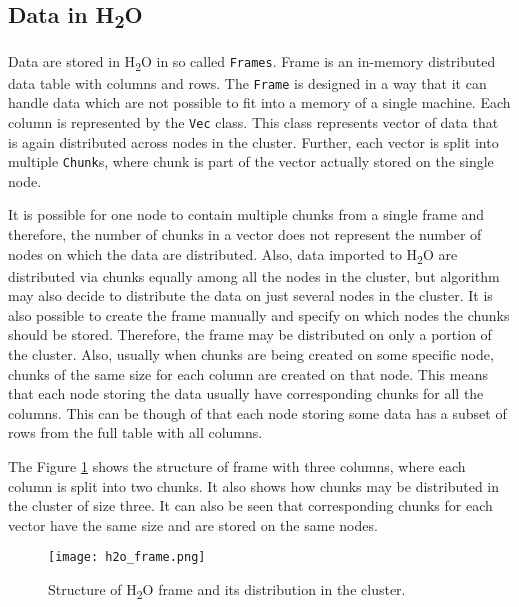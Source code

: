 \subsection{Data in H\textsubscript{2}O}
Data are stored in H\textsubscript{2}O in so called \texttt{Frames}. Frame is an in-memory distributed data table with columns and rows. The \texttt{Frame} is designed in a way that it can handle data which are not possible to fit into a memory of a single machine. Each column is represented by the \texttt{Vec} class. This class represents vector of data that is again distributed across nodes in the cluster. Further, each vector is split into multiple \texttt{Chunk}s, where chunk is part of the vector actually stored on the single node. 

It is possible for one node to contain multiple chunks from a single frame and therefore, the number of chunks in a vector does not represent the number of nodes on which the data are distributed. Also, data imported to H\textsubscript{2}O are distributed via chunks equally among all the nodes in the cluster, but algorithm may also decide to distribute the data on just several nodes in the cluster. It is also possible to create the frame manually and specify on which nodes the chunks should be stored. Therefore, the frame may be distributed on only a portion of the cluster. Also, usually when chunks are being created on some specific node, chunks of the same size for each column are created on that node. This means that each node storing the data usually have corresponding chunks for all the columns. This can be though of that each node storing some data has a subset of rows from the full table with all columns.

The Figure \ref{fig:h2o_frame} shows the structure of frame with three columns, where each column is split into two chunks. It also shows how chunks may be distributed in the cluster of size three. It can also be seen that corresponding chunks for each vector have the same size and are stored on the same nodes. 

	\begin{figure}
		\centering
		\texttt{[image: h2o\_frame.png]}
		\caption{Structure of H\textsubscript{2}O frame and its distribution in the cluster.}
		\label{fig:h2o_frame}
	\end{figure}

